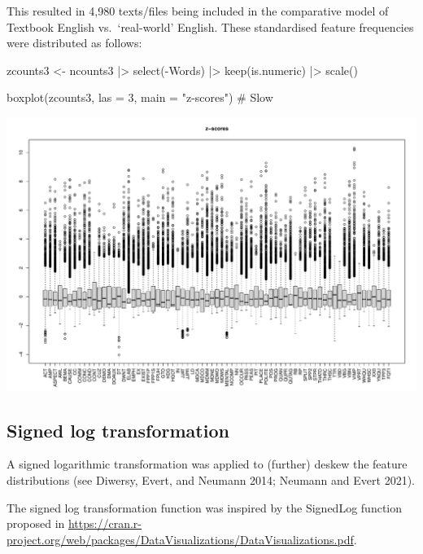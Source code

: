 \documentclass[
  letterpaper,
  DIV=11,
  numbers=noendperiod]{scrreprt}
\newenvironment{Shaded}{\begin{snugshade}}{\end{snugshade}}
\newcommand{\AttributeTok}[1]{\textcolor[rgb]{0.40,0.45,0.13}{#1}}
\newcommand{\CommentTok}[1]{\textcolor[rgb]{0.37,0.37,0.37}{#1}}
\newcommand{\DecValTok}[1]{\textcolor[rgb]{0.68,0.00,0.00}{#1}}
\newcommand{\FunctionTok}[1]{\textcolor[rgb]{0.28,0.35,0.67}{#1}}
\newcommand{\NormalTok}[1]{\textcolor[rgb]{0.00,0.23,0.31}{#1}}
\newcommand{\OtherTok}[1]{\textcolor[rgb]{0.00,0.23,0.31}{#1}}
\newcommand{\SpecialCharTok}[1]{\textcolor[rgb]{0.37,0.37,0.37}{#1}}
\newcommand{\StringTok}[1]{\textcolor[rgb]{0.13,0.47,0.30}{#1}}
\begin{document}
This resulted in 4,980 texts/files being included in the comparative
model of Textbook English vs.~`real-world' English. These standardised
feature frequencies were distributed as follows:

\begin{Shaded}
\begin{Highlighting}[]
\NormalTok{zcounts3 }\OtherTok{\textless{}{-}}\NormalTok{ ncounts3 }\SpecialCharTok{|\textgreater{}}
  \FunctionTok{select}\NormalTok{(}\SpecialCharTok{{-}}\NormalTok{Words) }\SpecialCharTok{|\textgreater{}} 
  \FunctionTok{keep}\NormalTok{(is.numeric) }\SpecialCharTok{|\textgreater{}} 
  \FunctionTok{scale}\NormalTok{()}

\FunctionTok{boxplot}\NormalTok{(zcounts3, }\AttributeTok{las =} \DecValTok{3}\NormalTok{, }\AttributeTok{main =} \StringTok{"z{-}scores"}\NormalTok{) }\CommentTok{\# Slow}
\end{Highlighting}
\end{Shaded}

\includegraphics{F_Ch7_DataPrep_files/figure-pdf/z-transformed-distributions-1.pdf}

\subsection{Signed log
transformation}\label{signed-log-transformation-1}

A signed logarithmic transformation was applied to (further) deskew the
feature distributions (see Diwersy, Evert, and Neumann 2014; Neumann and
Evert 2021).

The signed log transformation function was inspired by the SignedLog
function proposed in
\url{https://cran.r-project.org/web/packages/DataVisualizations/DataVisualizations.pdf}.
\end{document}
